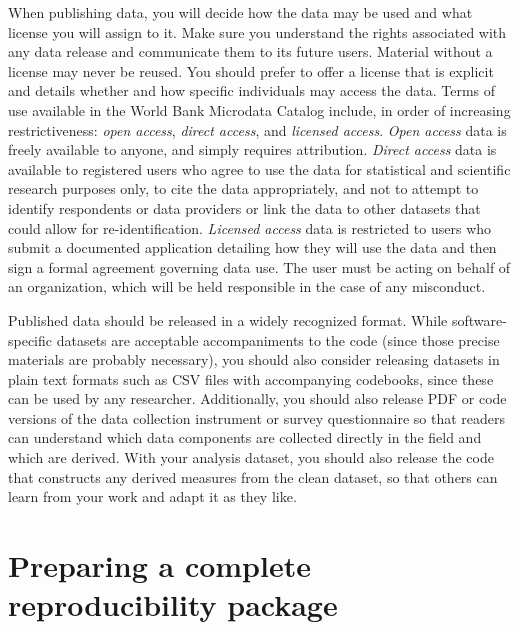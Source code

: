 When publishing data,
you will decide how the data may be used and what license you will assign to it.
Make sure you understand the rights associated with any data release
and communicate them to its future users.
Material without a license may never be reused.
You should prefer to offer a license that is explicit
and details whether and how specific individuals may access the data.
Terms of use available in the World Bank Microdata Catalog include,
in order of increasing restrictiveness:
\textit{open access}, \textit{direct access}, and \textit{licensed access}.
\textit{Open access} data is freely available to anyone, and simply requires attribution.
\textit{Direct access} data is available to registered users who agree
to use the data for statistical and scientific research purposes only,
to cite the data appropriately,
and not to attempt to identify respondents or data providers
or link the data to other datasets that could allow for re-identification.
\textit{Licensed access} data is restricted to users
who submit a documented application detailing
how they will use the data and then sign a formal agreement governing data use.
The user must be acting on behalf of an organization,
which will be held responsible in the case of any misconduct.

Published data should be released in a widely recognized format.
While software-specific datasets are acceptable accompaniments to the code
(since those precise materials are probably necessary),
you should also consider releasing datasets in plain text formats
such as CSV files with accompanying codebooks,
since these can be used by any researcher.
Additionally, you should also release PDF or code versions of
the data collection instrument or survey questionnaire
so that readers can understand which data components are
collected directly in the field and which are derived.
With your analysis dataset,
you should also release the code
that constructs any derived measures
from the clean dataset,
so that others can learn from your work and adapt it as they like.

\section{Preparing a complete reproducibility package}

